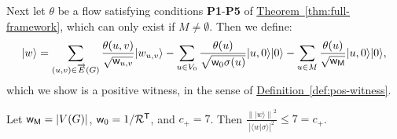 \documentclass{theoretics}
\newcommand{\thm}[1]{\hyperref[thm:#1]{Theorem~\ref*{thm:#1}}}
\newcommand{\defin}[1]{\hyperref[def:#1]{Definition~\ref*{def:#1}}}
\def\ket#1{{\lvert}#1\rangle}
\renewcommand{\>}{\rangle}
\newcommand{\<}{\langle}
\renewcommand{\(}{\left(}
\renewcommand{\)}{\right)}
\def\braket#1#2{{{\langle}#1\vert}#2\rangle}
\def\norm#1{\left\| #1 \right\|}
\def\w{{\sf w}}
\begin{document}
Next let $\theta$ be a flow satisfying conditions \textbf{P1}-\textbf{P5} of \thm{full-framework}, which can only exist if $M\neq\emptyset$. Then
we define:
\begin{equation}
\ket{w}=\sum_{(u,v)\in \overrightarrow{E}(G)}\frac{\theta(u,v)}{\sqrt{\w_{u,v}}}\ket{w_{u,v}}-\sum_{u\in V_0}\frac{\theta(u)}{\sqrt{\w_0\sigma(u)}}\ket{u,0}\ket{0}-\sum_{u\in M}\frac{\theta(u)}{\sqrt{\w_{\sf M}}}\ket{u,0}\ket{0},\label{eq:full-fwk-w}
\end{equation}
which we show is a positive witness, in the sense of \defin{pos-witness}. 


\begin{lemma}\label{lem:full-fwk-pos-1}
Let $\w_{\sf M}=|V(G)|$, $\w_0=1/{\cal R}^{\sf T}$, and $c_+=7$. Then $\displaystyle \frac{\norm{\ket{w}}^2}{|\braket{w}{\sigma}|^2}  \leq 7 = c_+$.
\end{lemma}
\end{document}

